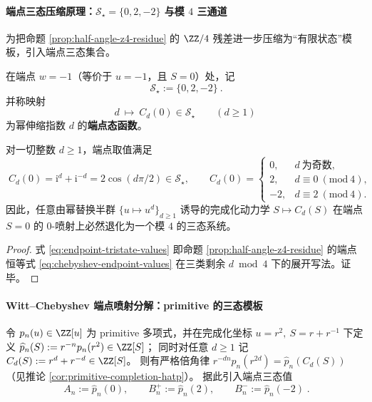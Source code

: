 \paragraph{端点三态压缩原理：\texorpdfstring{$\mathcal S_{\star}=\{0,2,-2\}$}{S*={0,2,-2}} 与模 \texorpdfstring{$4$}{4} 三通道}
为把命题 \ref{prop:half-angle-z4-residue} 的 \(\ZZ/4\) 残差进一步压缩为“有限状态”模板，引入端点三态集合。

\begin{definition}[端点三态集合与端点态函数]\label{def:endpoint-tristate-set}
在端点 \(w=-1\)（等价于 \(u=-1\)，且 \(S=0\)）处，记
\[
\boxed{\ \mathcal S_{\star}:=\{0,2,-2\}\ }.
\]
并称映射
\[
d\ \longmapsto\ C_d(0)\in\mathcal S_{\star}\qquad(d\ge 1)
\]
为幂伸缩指数 \(d\) 的\textbf{端点态函数}。
\end{definition}

\begin{corollary}\label{cor:endpoint-tristate-compression}
对一切整数 \(d\ge 1\)，端点取值满足
\begin{equation}\label{eq:endpoint-tristate-values}
\boxed{\;
C_d(0)=\mathrm{i}^{d}+\mathrm{i}^{-d}=2\cos(d\pi/2)\in\mathcal S_{\star},\qquad
C_d(0)=
\begin{cases}
0, & d\ \text{为奇数},\\
2, & d\equiv 0\ (\mathrm{mod}\ 4),\\
-2,& d\equiv 2\ (\mathrm{mod}\ 4).
\end{cases}\;}
\end{equation}
因此，任意由幂替换半群 \(\{u\mapsto u^d\}_{d\ge 1}\) 诱导的完成化动力学 \(S\mapsto C_d(S)\) 在端点 \(S=0\) 的 \(0\)-喷射上必然退化为一个模 \(4\) 的三态系统。
\end{corollary}
\begin{proof}
式 \eqref{eq:endpoint-tristate-values} 即命题 \ref{prop:half-angle-z4-residue} 的端点恒等式 \eqref{eq:chebyshev-endpoint-values} 在三类剩余 \(d\bmod 4\) 下的展开写法。证毕。
\end{proof}

\paragraph{Witt--Chebyshev 端点喷射分解：primitive 的三态模板}
令 \(p_n(u)\in\ZZ[u]\) 为 primitive 多项式，并在完成化坐标 \(u=r^2,\ S=r+r^{-1}\) 下定义
\(\widehat p_n(S):=r^{-n}p_n(r^2)\in\ZZ[S]\)；
同时对任意 \(d\ge 1\) 记 \(C_d(S):=r^d+r^{-d}\in\ZZ[S]\)。
则有严格倍角律 \(r^{-dn}p_n(r^{2d})=\widehat p_n(C_d(S))\)（见推论 \ref{cor:primitive-completion-hatp}）。
据此引入端点三态值
\begin{equation}\label{eq:primitive-endpoint-tristate-values}
\boxed{\;
A_n:=\widehat p_n(0),\qquad
B_n^{+}:=\widehat p_n(2),\qquad
B_n^{-}:=\widehat p_n(-2)\; }.
\end{equation}

